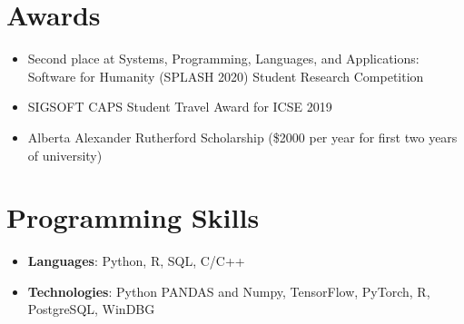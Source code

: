 \documentclass[letterpaper,11pt]{article}
\newcommand{\resumeSubHeadingListStart}{\begin{itemize}[leftmargin=*]}
\newcommand{\resumeSubHeadingListEnd}{\end{itemize}}
\begin{document}
\section{Awards}
\resumeSubHeadingListStart
\item{Second place at Systems, Programming, Languages, and Applications: Software for Humanity (SPLASH 2020) Student Research Competition}

\item{SIGSOFT CAPS Student Travel Award for ICSE 2019}


\item{Alberta Alexander Rutherford Scholarship (\$2000 per year for first two years of university)	
}


\resumeSubHeadingListEnd


\section{Programming Skills}
 \resumeSubHeadingListStart
   \item{
        \textbf{Languages}{: Python, R, SQL, C/C++}
    }
    \item{
        \textbf{Technologies}{: Python PANDAS and Numpy, TensorFlow, PyTorch, R, PostgreSQL, WinDBG}
    }
 \resumeSubHeadingListEnd
\end{document}
